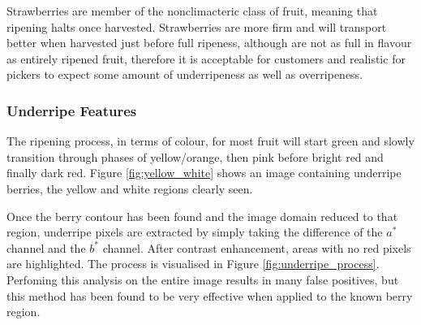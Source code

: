 \documentclass[fleqn,twoside]{article}
\begin{document}
Strawberries are member of the nonclimacteric class of fruit, meaning that ripening halts once harvested. Strawberries are more firm and will transport better when harvested just before full ripeness, although are not as full in flavour as entirely ripened fruit\cite{artur}, therefore it is acceptable for customers and realistic for pickers to expect some amount of underripeness as well as overripeness. 


\subsubsection{Underripe Features}

The ripening process, in terms of colour, for most fruit will start green and slowly transition through phases of yellow/orange, then pink before bright red and finally dark red. Figure \ref{fig:yellow_white} shows an image containing underripe berries, the yellow and white regions clearly seen.

Once the berry contour has been found and the image domain reduced to that region, underripe pixels are extracted by simply taking the difference of the $a^*$ channel and the $b^*$ channel. After contrast enhancement, areas with no red pixels are highlighted. The process is visualised in Figure \ref{fig:underripe_process}. Perfoming this analysis on the entire image results in many false positives, but this method has been found to be very effective when applied to the known berry region.   
\end{document}
